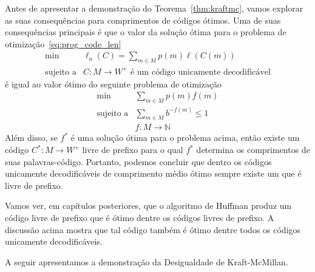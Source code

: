 Antes de apresentar a demonstração do Teorema~\ref{thm:kraftmc}, vamos
explorar as suas consequências para comprimentos de códigos ótimos. 
Uma de suas consequências principais é que o valor da solução
ótima para o problema de otimização~\ref{eq:prog_code_len}
\begin{equation*} 
  \begin{array}{rl}
    \min & \ell_a(C) = \sum_{m\in M} p(m) \ell(C(m))\\
    \text{sujeito a} &C: M \to W^+ \text{ é um código unicamente decodificável}
  \end{array}
\end{equation*}
é igual ao valor ótimo do seguinte problema de otimização
\begin{equation*} 
  \begin{array}{rl}
    \min & \sum_{m\in M} p(m) f(m)\\
    \text{sujeito a} &\sum_{m \in M} b^{-f(m)} \leq 1\\
    & f:M\to\mathbb{N}
  \end{array}
\end{equation*}
Além disso, se $f^*$ é uma solução ótima para o problema acima, então
existe um código $C^*: M \to W^+$ livre de prefixo para o qual $f^*$
determina os comprimentos de suas palavras-código. Portanto, podemos
concluir que dentro os códigos unicamente decodificáveis de
comprimento médio ótimo sempre existe um que é livre de prefixo.
 
Vamos ver, em capítulos posteriores, que o algoritmo de Huffman produz
um código livre de prefixo que é ótimo dentre os códigos livres de
prefixo. A discussão acima mostra que tal código também é ótimo dentre
todos os códigos unicamente decodificáveis.

A seguir apresentamos a demonstração da Desigualdade de
Kraft-McMillan.

